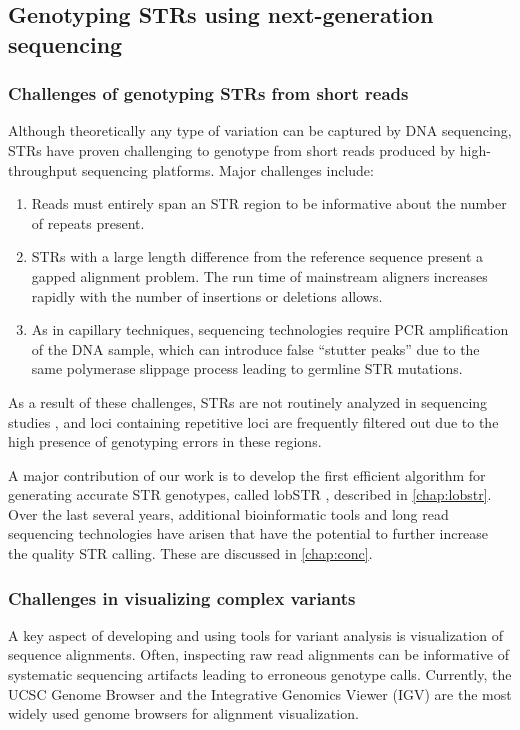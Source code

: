 \subsection{Genotyping STRs using next-generation sequencing}
\subsubsection{Challenges of genotyping STRs from short reads}
Although theoretically any type of variation can be captured by DNA sequencing, STRs have proven challenging to genotype from short reads produced by high-throughput sequencing platforms. Major challenges include:
\begin{enumerate}
\item Reads must entirely span an STR region to be informative about the number of repeats present.
\item STRs with a large length difference from the reference sequence present a gapped alignment problem. The run time of mainstream aligners increases rapidly  with the number of insertions or deletions allows.
\item As in capillary techniques, sequencing technologies require PCR amplification of the DNA sample, which can introduce false ``stutter peaks'' due to the same polymerase slippage process leading to germline STR mutations.
\end{enumerate}
As a result of these challenges, STRs are not routinely analyzed in sequencing studies \cite{TreangenSalzberg2012}, and loci containing repetitive loci are frequently filtered out due to the high presence of genotyping errors in these regions.

A major contribution of our work is to develop the first efficient algorithm for generating accurate STR genotypes, called lobSTR \cite{GymrekGolanRossetEtAl2012}, described in \autoref{chap:lobstr}. Over the last several years, additional bioinformatic tools and long read sequencing technologies have arisen that have the potential to further increase the quality STR calling. These are discussed in \autoref{chap:conc}.

\subsubsection{Challenges in visualizing complex variants}
A key aspect of developing and using tools for variant analysis is visualization of sequence alignments. Often, inspecting raw read alignments can be informative of systematic sequencing artifacts leading to erroneous genotype calls. Currently, the UCSC Genome Browser \cite{KentSugnetFureyEtAl2002} and the Integrative Genomics Viewer (IGV) \cite{RobinsonThorvaldsdottirWincklerEtAl2011} are the most widely used genome browsers for alignment visualization.

